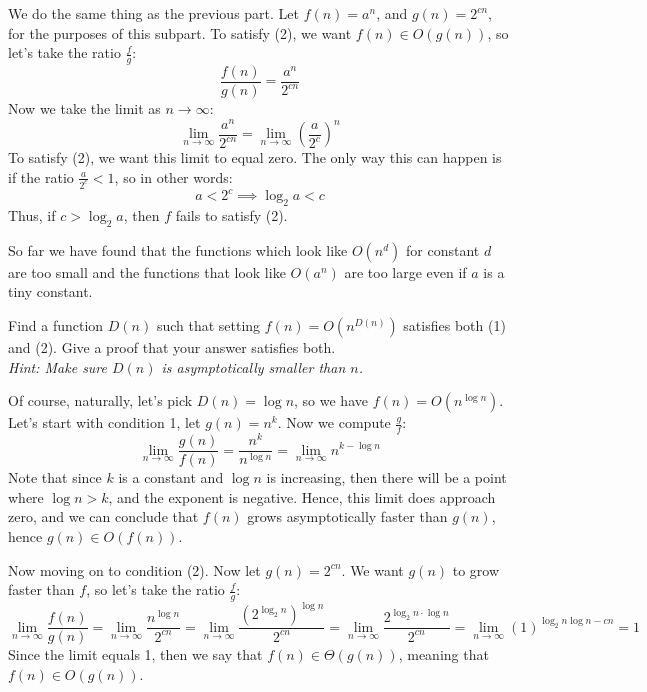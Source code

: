 \documentclass[11pt]{article}
\begin{document}
\begin{subparts}
	\begin{solution}
		We do the same thing as the previous part. Let $f(n) = a^n$, and $g(n) = 2^{cn}$, for the purposes
		of this subpart. To satisfy (2), we want $f(n) \in O(g(n))$, so let's take the ratio $\frac{f}{g}$:
		\[
			\frac{f(n)}{g(n)} = \frac{a^n}{2^{cn}}
		\] 
		Now we take the limit as $n \to \infty$:
		\[
			\lim_{n \to \infty} \frac{a^n}{2^{cn}} = \lim_{n \to \infty} \left( \frac{a}{2^c}\right)^n
		\] 
		To satisfy (2), we want this limit to equal zero. The only way this can happen is if the ratio 
		$\frac{a}{2^c} < 1$, so in other words: 
		\[
		a < 2^c \implies \log_2 a < c
		\] 
		Thus, if $c > \log_2a$, then $f$ fails to satisfy (2). 
	\end{solution}

So far we have found that the functions which look like $O(n^d)$ for constant $d$ are too small and the functions that look like $O(a^n)$ are too large even if $a$ is a tiny constant.

    \subpart Find a function $D(n)$ such that setting $f(n) = O(n^{D(n)})$ satisfies both (1) and (2). Give a proof that your answer satisfies both. \\ \textit{Hint: Make sure $D(n)$ is asymptotically smaller than $n$.} 

	\begin{solution}
		Of course, naturally, let's pick $D(n) = \log n$, so we have $f(n) = O(n^{\log n})$. Let's start
		with condition 1, let $g(n) = n^k$. Now we compute $\frac{g}{f}$:
		\[
			\lim_{n \to \infty} \frac{g(n)}{f(n)} = \frac{n^k}{n^{\log n}} = \lim_{n \to \infty} n^{k - \log n}
		\] 
		Note that since $k$ is a constant and $\log n$ is increasing, then there will be a point where 
		$\log n > k$, and the exponent is negative. Hence, this limit does approach zero, and we can conclude 
		that $f(n)$ grows asymptotically faster than $g(n)$, hence $g(n) \in O(f(n))$. 

		Now moving on to condition (2). Now let $g(n) = 2^{cn}$. We want $g(n)$ to grow faster than $f$, so 
		let's take the ratio $\frac{f}{g}$:
		\[
			\lim_{n \to \infty} \frac{f(n)}{g(n)} =\lim_{n \to \infty} \frac{n^{\log n}}{2^{cn}} =
			\lim_{n \to \infty} \frac{(2^{\log_2n})^{\log n}}{2^{cn}} = \lim_{n \to \infty} \frac{2^{\log_2n \cdot \log n}}{2^{cn}} = \lim_{n \to \infty} (1)^{\log_2 n \log n - cn} = 1
		\] 
		Since the limit equals 1, then we say that $f(n) \in \Theta(g(n))$, meaning that $f(n) \in O(g(n))$. 
	\end{solution}
\end{subparts}
\end{document}
